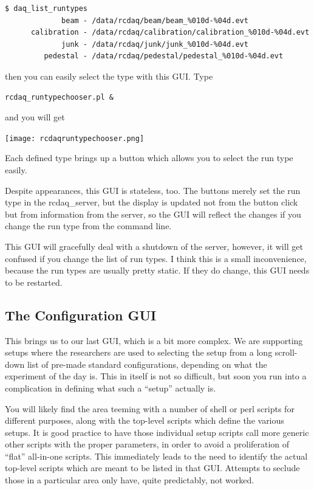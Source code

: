 \documentclass{article}[11pt]
\begin{document}
\begin{verbatim}
$ daq_list_runtypes
             beam - /data/rcdaq/beam/beam_%010d-%04d.evt
      calibration - /data/rcdaq/calibration/calibration_%010d-%04d.evt
             junk - /data/rcdaq/junk/junk_%010d-%04d.evt
         pedestal - /data/rcdaq/pedestal/pedestal_%010d-%04d.evt
\end{verbatim}

then you can easily select the type with this GUI. Type

\begin{verbatim}
rcdaq_runtypechooser.pl &
\end{verbatim}

and you will get 

\begin{center}
\texttt{[image: rcdaqruntypechooser.png]}
\end{center}

Each defined type brings up a button which allows you to  select the run type
easily.

Despite appearances, this GUI is stateless, too. The buttons merely
set the run type in the rcdaq\_server, but the display is updated not
from the button click but from information from the server, so the GUI
will reflect the changes if you change the run type from the command line.

This GUI will gracefully deal with a shutdown of the server, however,
it will get confused if you change the list of run types. I think this
is a small inconvenience, because the run types are usually pretty
static. If they do change, this GUI needs to be restarted. 

\subsection{The Configuration GUI}

This brings us to our last GUI, which is a bit more complex. We are
supporting setups where the researchers are used to selecting the
setup from a long scroll-down list of pre-made standard
configurations, depending on what the experiment of the day is. This
in itself is not so difficult, but soon you run into a complication
in defining what such a ``setup'' actually is.

You will likely find the area teeming with a number of shell or perl
scripts for different purposes, along with the top-level scripts which
define the various setups.  It is good practice to have those
individual setup scripts call more generic other scripts with the
proper parameters, in order to avoid a proliferation of ``flat''
all-in-one scripts. This immediately leads to the need to identify the
actual top-level scripts which are meant to be listed in that
GUI. Attempts to seclude those in a particular area only have, quite
predictably, not worked.
\end{document}

